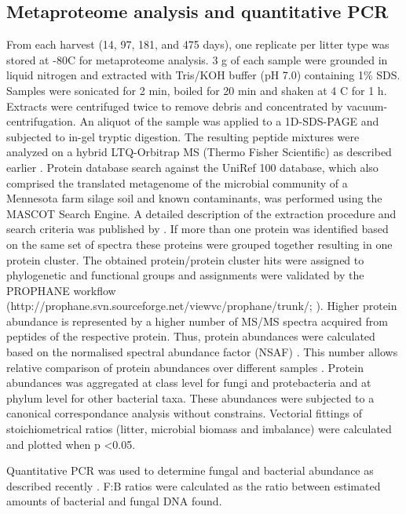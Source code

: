 \subsection*{Metaproteome analysis and quantitative PCR}

From each harvest (14, 97, 181, and 475 days), one replicate per litter type was stored at -80\textdegree C for metaproteome analysis. 3 g of each sample were grounded in liquid nitrogen and extracted with Tris/KOH buffer (pH 7.0) containing 1\% SDS. Samples were sonicated for 2 min, boiled for 20 min and shaken at 4 \textdegree C for 1 h. Extracts were centrifuged twice to remove debris and concentrated by vacuum-centrifugation. An aliquot of the sample was applied to a 1D-SDS-PAGE and subjected to in-gel tryptic digestion. The resulting peptide mixtures were analyzed on a hybrid LTQ-Orbitrap MS (Thermo Fisher Scientific) as described earlier \cite{Schneider2010}. Protein database search against the UniRef 100 database, which also comprised the translated metagenome of the microbial community of a Mennesota farm silage soil \cite{Tringe2005} and known contaminants, was performed using the MASCOT Search Engine. A detailed description of the extraction procedure and search criteria was published by \cite{Keiblinger2011}. If more than one protein was identified based on the same set of spectra these  proteins were grouped together resulting in one protein cluster. The obtained protein/protein cluster hits were assigned to phylogenetic and functional groups and assignments were validated by the PROPHANE workflow (http://prophane.svn.sourceforge.net/viewvc/prophane/trunk/; \cite{Schneider2011}). Higher protein abundance is represented by a higher number of MS/MS spectra acquired from peptides of the respective protein. Thus, protein abundances were calculated based on the normalised spectral abundance factor (NSAF) \cite{Florens2006, Zybailov2006}. This number allows relative comparison of protein abundances over different samples \cite{Bantscheff2007}. Protein abundances was aggregated at class level for fungi and protebacteria and at phylum level for other bacterial taxa. These abundances were subjected to a canonical correspondance analysis without constrains. Vectorial fittings of stoichiometrical ratios (litter, microbial biomass and imbalance) were calculated and plotted when p \textless 0.05.

Quantitative PCR was used to determine fungal and bacterial abundance as described recently \cite{Inselsbacher2010}. F:B ratios were calculated as the ratio between estimated amounts of bacterial and fungal DNA found.